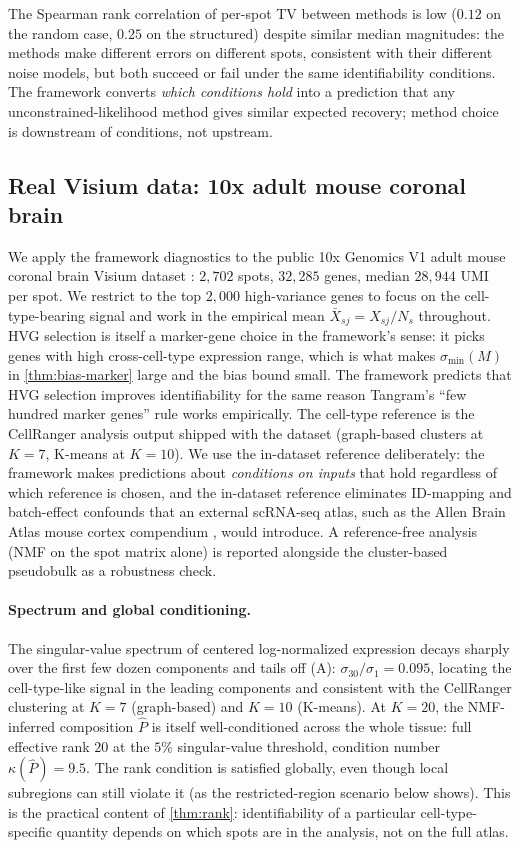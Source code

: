 The Spearman rank correlation of per-spot TV between methods is
low ($0.12$ on the random case, $0.25$ on the structured) despite
similar median magnitudes: the methods make different errors on
different spots, consistent with their different noise models, but
both succeed or fail under the same identifiability conditions.
The framework converts \emph{which conditions hold} into a
prediction that any unconstrained-likelihood method gives similar
expected recovery; method choice is downstream of conditions, not
upstream.

\subsection{Real Visium data: 10x adult mouse coronal brain}

We apply the framework diagnostics to the public 10x Genomics V1
adult mouse coronal brain Visium dataset
\citep{tenx2020mousebrain}: $2{,}702$ spots, $32{,}285$ genes,
median $28{,}944$ UMI per spot. We restrict to the top $2{,}000$
high-variance genes to focus on the cell-type-bearing signal and
work in the empirical mean $\bar{X}_{sj} = X_{sj}/N_s$ throughout.
HVG selection is itself a marker-gene choice in the framework's
sense: it picks genes with high cross-cell-type expression range,
which is what makes $\sigma_{\min}(M)$ in \cref{thm:bias-marker}
large and the bias bound small. The framework predicts that HVG
selection improves identifiability for the same reason Tangram's
``few hundred marker genes'' rule works empirically.
The cell-type reference is the CellRanger analysis output shipped
with the dataset (graph-based clusters at $K = 7$, K-means at $K =
10$). We use the in-dataset reference deliberately: the framework
makes predictions about \emph{conditions on inputs} that hold
regardless of which reference is chosen, and the in-dataset
reference eliminates ID-mapping and batch-effect confounds that an
external scRNA-seq atlas, such as the Allen Brain Atlas mouse
cortex compendium \citep{tasic2018shared}, would introduce. A reference-free
analysis (NMF on the spot matrix alone) is reported alongside the
cluster-based pseudobulk as a robustness check.

\paragraph{Spectrum and global conditioning.} The singular-value
spectrum of centered log-normalized expression decays sharply over
the first few dozen components and tails off (A):
$\sigma_{30}/\sigma_1 = 0.095$, locating the cell-type-like signal
in the leading components and consistent with the CellRanger
clustering at $K = 7$ (graph-based) and $K = 10$ (K-means). At
$K = 20$, the NMF-inferred composition $\hat P$ is itself
well-conditioned across the whole tissue: full effective rank $20$
at the $5\%$ singular-value threshold, condition number
$\kappa(\hat P) = 9.5$. The rank condition is satisfied globally,
even though local subregions can still violate it (as the
restricted-region scenario below shows). This is the practical
content of \cref{thm:rank}: identifiability of a particular
cell-type-specific quantity depends on which spots are in the
analysis, not on the full atlas.

